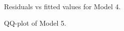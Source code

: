 \documentclass[review,12pt,authoryear]{elsarticle}
\begin{document}
\begin{linenumbers}
\begin{figure}
  \caption{Residuals vs fitted values for Model 4.}
\end{figure}
\begin{figure}
  \caption{QQ-plot of Model 5.}
\end{figure}


\end{linenumbers}
\end{document}
